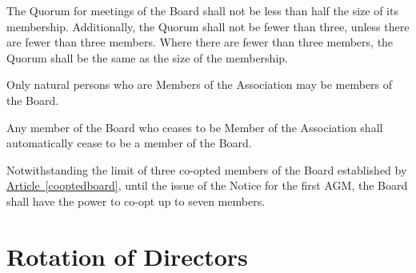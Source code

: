 \documentclass[12pt]{article}
\newcommand{\EC}[0]{Board}
\newcommand{\Exec}[0]{\EC{} }
\newcommand{\articleref}[1]{\hyperref[#1]{Article~\ref*{#1}}}
\begin{document}
\begin{constenum}
  \item The Quorum for meetings of the \Exec shall not be less than
    half the size of its membership. Additionally, the Quorum shall
    not be fewer than three, unless there are fewer than three
    members. Where there are fewer than three members, the Quorum shall
    be the same as the size of the membership.

  \item Only natural persons who are Members of the Association
    may be members of the \EC{}.

  \item Any member of the \Exec who ceases to be Member of the Association
    shall automatically cease to be a member of the \EC{}.

  \item Notwithstanding the limit of three co-opted members of the
    \Exec established by \articleref{cooptedboard}, until the issue of
    the Notice for the first AGM, the \Exec shall have the power to
    co-opt up to seven members.

  \end{constenum}


\section{Rotation of Directors}
\end{document}
